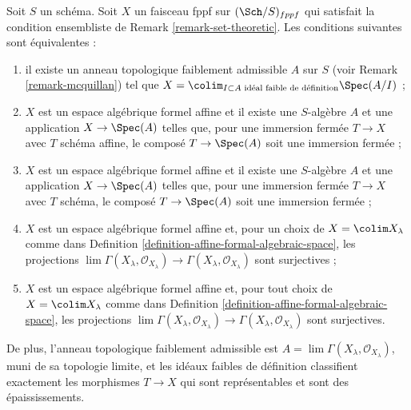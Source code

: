 \begin{lemma}
\label{lemma-mcquillan-affine-formal-algebraic-space}
Soit $S$ un schéma. Soit $X$ un faisceau fppf sur $(\Sch/S)_{fppf}$
qui satisfait la condition ensembliste de
Remark \ref{remark-set-theoretic}.
Les conditions suivantes sont équivalentes :
\begin{enumerate}
\item il existe un anneau topologique faiblement admissible $A$ sur $S$
(voir Remark \ref{remark-mcquillan}) tel que
$X = \colim_{I \subset A\text{ idéal faible de définition}} \Spec(A/I)$ ;
\item $X$ est un espace algébrique formel affine et
il existe une $S$-algèbre $A$ et une application $X \to \Spec(A)$
telles que, pour une immersion fermée $T \to X$ avec $T$ schéma affine,
le composé $T \to \Spec(A)$ soit une immersion fermée ;
\item $X$ est un espace algébrique formel affine et
il existe une $S$-algèbre $A$ et une application $X \to \Spec(A)$
telles que, pour une immersion fermée $T \to X$ avec $T$ schéma,
le composé $T \to \Spec(A)$ soit une immersion fermée ;
\item $X$ est un espace algébrique formel affine et, pour un choix de
$X = \colim X_\lambda$ comme dans
Definition \ref{definition-affine-formal-algebraic-space},
les projections $\lim \Gamma(X_\lambda, \mathcal{O}_{X_\lambda})
\to \Gamma(X_\lambda, \mathcal{O}_{X_\lambda})$ sont surjectives ;
\item $X$ est un espace algébrique formel affine et, pour tout choix
de $X = \colim X_\lambda$ comme dans
Definition \ref{definition-affine-formal-algebraic-space},
les projections $\lim \Gamma(X_\lambda, \mathcal{O}_{X_\lambda})
\to \Gamma(X_\lambda, \mathcal{O}_{X_\lambda})$ sont surjectives.
\end{enumerate}
De plus, l'anneau topologique faiblement admissible est
$A = \lim \Gamma(X_\lambda, \mathcal{O}_{X_\lambda})$,
muni de sa topologie limite, et les idéaux faibles de définition
classifient exactement les morphismes $T \to X$ qui sont représentables
et sont des épaississements.
\end{lemma}

